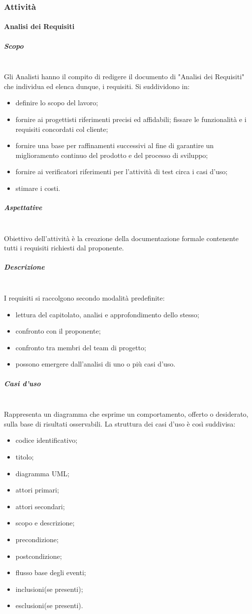 \subsubsection{Attività}
\paragraph{Analisi dei Requisiti}
\subparagraph{Scopo} \mbox{}\\
Gli Analisti hanno il compito di redigere il documento di
"Analisi dei Requisiti" che individua ed elenca dunque, i requisiti.
Si suddividono in:
\begin{itemize}
	\item definire lo scopo del lavoro;
	\item fornire ai progettisti riferimenti precisi ed affidabili;
	fissare le funzionalità e i requisiti concordati col cliente;
	\item fornire  una  base  per  raffinamenti  successivi  al  fine  di  garantire  un miglioramento continuo del prodotto e del processo di sviluppo;
	\item fornire ai verificatori riferimenti per l’attività di test circa i casi d’uso;
	\item stimare i costi.
\end{itemize}
\subparagraph{Aspettative} \mbox{}\\
Obiettivo dell’attività è la creazione della documentazione formale contenente tutti i
requisiti richiesti dal proponente.
\subparagraph{Descrizione} \mbox{}\\
I requisiti si raccolgono secondo modalità predefinite:
\begin{itemize}
	\item lettura del capitolato, analisi e approfondimento dello stesso;
	\item confronto con il proponente;
	\item confronto tra membri del team di progetto;
	\item possono emergere dall'analisi di uno o più casi d'uso.
\end{itemize}
\subparagraph{Casi d'uso} \mbox{}\\
Rappresenta un diagramma che esprime un comportamento,
offerto o desiderato, sulla base di risultati osservabili.
La struttura dei casi d'uso è così suddivisa:
\begin{itemize}
	\item codice identificativo;
	\item titolo;
	\item diagramma UML;
	\item attori primari;
	\item attori secondari;
	\item scopo e descrizione;
	\item precondizione;
	\item postcondizione;
	\item flusso base degli eventi;
	\item inclusioni(se presenti);
	\item esclusioni(se presenti).
\end{itemize}

